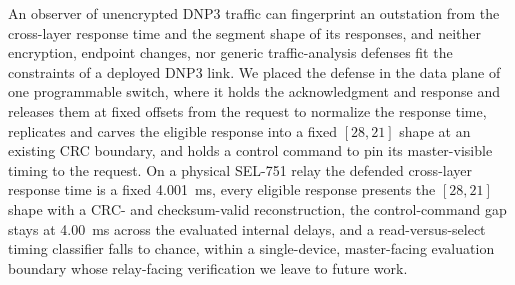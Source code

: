 \documentclass[conference]{IEEEtran}
\begin{document}
An observer of unencrypted DNP3 traffic can fingerprint an outstation from the cross-layer response
time and the segment shape of its responses, and neither encryption, endpoint changes, nor generic
traffic-analysis defenses fit the constraints of a deployed DNP3 link. We placed the defense in the
data plane of one programmable switch, where it holds the acknowledgment and response and releases them
at fixed offsets from the request to normalize the response time, replicates and carves the eligible
response into a fixed $[28,21]$ shape at an existing CRC boundary, and holds a control command to pin
its master-visible timing to the request. On a physical SEL-751 relay the defended cross-layer response
time is a fixed 4.001~ms, every eligible response presents the $[28,21]$ shape with a CRC- and
checksum-valid reconstruction, the control-command gap stays at 4.00~ms across the evaluated internal
delays, and a read-versus-select timing classifier falls to chance, within a single-device,
master-facing evaluation boundary whose relay-facing verification we leave to future work.




\end{document}
